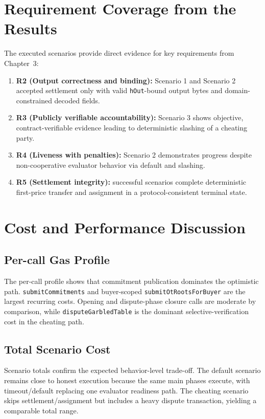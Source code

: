 \documentclass[final,twoside]{vutinfth}
\begin{document}
\section{Requirement Coverage from the Results}
The executed scenarios provide direct evidence for key requirements from
Chapter~3:
\begin{enumerate}
\item \textbf{R2 (Output correctness and binding):} Scenario 1 and Scenario 2 accepted settlement only with valid \texttt{hOut}-bound output bytes and domain-constrained decoded fields.
\item \textbf{R3 (Publicly verifiable accountability):} Scenario 3 shows objective, contract-verifiable evidence leading to deterministic slashing of a cheating party.
\item \textbf{R4 (Liveness with penalties):} Scenario 2 demonstrates progress despite non-cooperative evaluator behavior via default and slashing.
\item \textbf{R5 (Settlement integrity):} successful scenarios complete deterministic first-price transfer and assignment in a protocol-consistent terminal state.
\end{enumerate}

\section{Cost and Performance Discussion}
\subsection{Per-call Gas Profile}

The per-call profile shows that commitment publication dominates the optimistic
path.
\texttt{submitCommitments} and buyer-scoped
\texttt{submitOtRootsForBuyer} are the largest recurring costs.
Opening and dispute-phase closure calls are moderate by comparison, while
\texttt{disputeGarbledTable} is the dominant selective-verification cost in the
cheating path.

\subsection{Total Scenario Cost}

Scenario totals confirm the expected behavior-level trade-off.
The default scenario remains close to honest execution because the same main
phases execute, with timeout/default replacing one evaluator readiness path.
The cheating scenario skips settlement/assignment but includes a heavy dispute
transaction, yielding a comparable total range.
\end{document}
